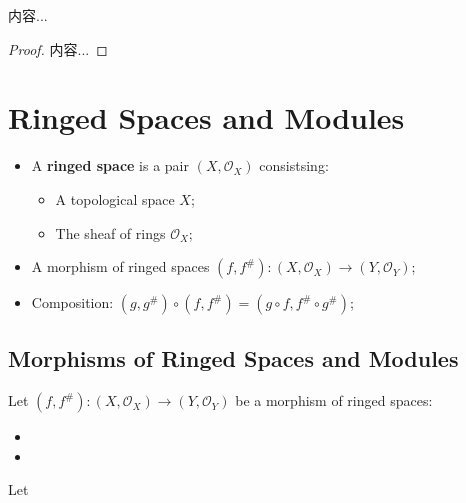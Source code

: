 \documentclass[Total.tex]{subfiles}
\begin{document}
				\begin{lemma}
					内容...
				\end{lemma}
				
				\begin{proof}
					内容...
				\end{proof}
		\section{Ringed Spaces and Modules}
		
			\begin{Def}
				\label{Sheaves-Sheaves-Ringed-Spaces}
				\begin{itemize}
					\item  A \textbf{ringed space} is a pair $(X,\mathcal{O}_X)$ consistsing:
					
					\begin{itemize}
						\item A topological space $X$;
						\item The sheaf of rings $\mathcal{O}_X$;
					\end{itemize}
					\item A morphism of ringed spaces $
					(f,f^\#):(X,\mathcal{O}_X)\rightarrow (Y,\mathcal{O}_Y)$;
					
					
					\item Composition: $(g,g^\#)\circ (f,f^\#)=(g\circ f,f^\#\circ g^\#)$;
					
				\end{itemize}
			\end{Def}
			
			\subsection{Morphisms of Ringed Spaces and Modules}
			
				\begin{Def}
					Let $(f,f^\#):(X,\mathcal{O}_X)\rightarrow (Y,\mathcal{O}_Y)$ be a morphism of ringed spaces:
					
					\begin{itemize}
						\item 
						
						\item 
					\end{itemize}
				\end{Def}
				
				\begin{lemma}
					Let 
				\end{lemma}
				
\end{document}
